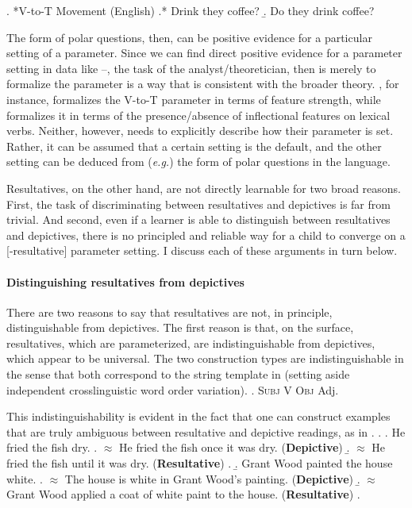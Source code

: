 \ex. *V-to-T Movement (English)
\a.* Drink they coffee?
\b. Do they drink coffee?

The form of polar questions, then, can be positive evidence for a particular setting of a parameter.
Since we can find direct positive evidence for a parameter setting in data like \LLast--\Last, the task of the analyst/theoretician, then is merely to formalize the parameter is a way that is consistent with the broader theory.
\textcite{chomsky1995minimalist}, for instance, formalizes the V-to-T parameter in terms of feature strength, while \textcite{lasnik1999verbal} formalizes it in terms of the presence/absence of inflectional features on lexical verbs.
Neither, however, needs to explicitly describe how their parameter is set.
Rather, it can be assumed that a certain setting is the default, and the other setting can be deduced from (\textit{e.g.}) the form of polar questions in the language.

Resultatives, on the other hand, are not directly learnable for two broad reasons.
First, the task of discriminating between resultatives and depictives is far from trivial.
And second, even if a learner is able to distinguish between resultatives and depictives, there is no principled and reliable way for a child to converge on a [-resultative] parameter setting.
I discuss each of these arguments in turn below.

\paragraph{Distinguishing resultatives from depictives}
There are two reasons to say that resultatives are not, in principle, distinguishable from depictives.
The first reason is that, on the surface, resultatives, which are parameterized, are indistinguishable from depictives, which appear to be universal.
The two construction types are indistinguishable in the sense that both correspond to the string template in \Next (setting aside independent crosslinguistic word order variation).
\ex. \textsc{Subj} V \textsc{Obj} Adj.

This indistinguishability is evident in the fact that one can construct examples that are truly ambiguous between resultative and depictive readings, as in \Next.
\ex. 
\a. He fried the fish dry.
\a. $\approx$ He fried the fish once it was dry. (\textbf{Depictive})
\b. $\approx$ He fried the fish until it was dry. (\textbf{Resultative})
\z.
\b. Grant Wood painted the house white.
\a. $\approx$ The house is white in Grant Wood's painting. (\textbf{Depictive})
\b. $\approx$ Grant Wood applied a coat of white paint to the house. (\textbf{Resultative})
\z.

